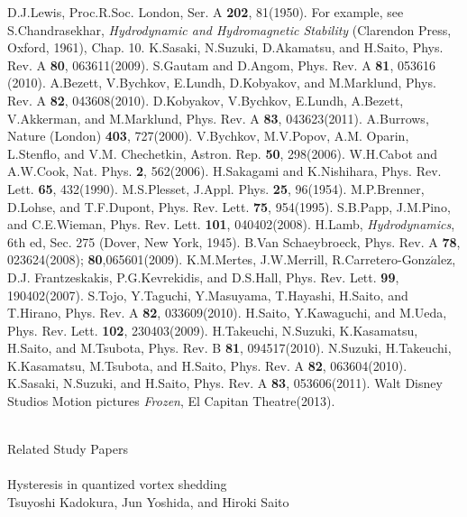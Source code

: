 \documentclass[12pt,a4paper]{report} %
\begin{document}
\begin{thebibliography}{81}
 D.J.Lewis, Proc.R.Soc. London, Ser. A {\bf 202}, 81(1950).
 For example, see S.Chandrasekhar, {\it Hydrodynamic and Hydromagnetic Stability} (Clarendon Press, Oxford, 1961), Chap. 10.
 K.Sasaki, N.Suzuki, D.Akamatsu, and H.Saito, Phys. Rev. A {\bf 80}, 063611(2009).
 S.Gautam and D.Angom, Phys. Rev. A {\bf 81}, 053616 (2010).
 A.Bezett, V.Bychkov, E.Lundh, D.Kobyakov, and M.Marklund, Phys. Rev. A {\bf 82}, 043608(2010).
 D.Kobyakov, V.Bychkov, E.Lundh, A.Bezett, V.Akkerman, and M.Marklund, Phys. Rev. A {\bf 83}, 043623(2011).
 A.Burrows, Nature (London) {\bf 403}, 727(2000).
 V.Bychkov, M.V.Popov, A.M. Oparin, L.Stenflo, and V.M. Chechetkin, Astron. Rep. {\bf 50}, 298(2006).
 W.H.Cabot and A.W.Cook, Nat. Phys. {\bf 2}, 562(2006).
 H.Sakagami and K.Nishihara, Phys. Rev. Lett. {\bf 65}, 432(1990).
 M.S.Plesset, J.Appl. Phys. {\bf 25}, 96(1954).
 M.P.Brenner, D.Lohse, and T.F.Dupont, Phys. Rev. Lett. {\bf 75}, 954(1995).
 S.B.Papp, J.M.Pino, and C.E.Wieman, Phys. Rev. Lett. {\bf 101}, 040402(2008).
 H.Lamb, {\it Hydrodynamics}, 6th ed, Sec. 275 (Dover, New York, 1945).
 B.Van Schaeybroeck, Phys. Rev. A {\bf 78}, 023624(2008); {\bf 80},065601(2009).
 K.M.Mertes, J.W.Merrill, R.Carretero-Gonz$\acute{a}$lez, D.J. Frantzeskakis, P.G.Kevrekidis, and D.S.Hall, Phys. Rev. Lett. {\bf 99}, 190402(2007).
 S.Tojo, Y.Taguchi, Y.Masuyama, T.Hayashi, H.Saito, and T.Hirano, Phys. Rev. A {\bf 82}, 033609(2010).
 H.Saito, Y.Kawaguchi, and M.Ueda, Phys. Rev. Lett. {\bf 102}, 230403(2009).
 H.Takeuchi, N.Suzuki, K.Kasamatsu, H.Saito, and M.Tsubota, Phys. Rev. B {\bf 81}, 094517(2010).
 N.Suzuki, H.Takeuchi, K.Kasamatsu, M.Tsubota, and H.Saito, Phys. Rev. A {\bf 82}, 063604(2010).
 K.Sasaki, N.Suzuki, and H.Saito, Phys. Rev. A {\bf 83}, 053606(2011).
 Walt Disney Studios Motion pictures {\it Frozen}, El Capitan Theatre(2013).
\end{thebibliography}
\newpage
\ 
\\
Related Study Papers
\\
\\
Hysteresis in quantized vortex shedding
\\
Tsuyoshi Kadokura, Jun Yoshida, and Hiroki Saito
\end{document}
